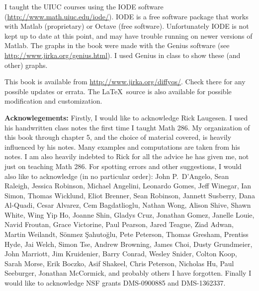 \medskip

I taught the UIUC courses using the IODE software
(\url{http://www.math.uiuc.edu/iode/}).  IODE is a free software package that
works with Matlab (proprietary) or Octave (free software).
Unfortunately IODE is not kept up to date at this point, and may have
trouble running on newer versions of Matlab.
The graphs in the book were made with
the Genius software
(see \url{http://www.jirka.org/genius.html}).  I used Genius
in class to show these (and other) graphs.

This book
is available from
\url{http://www.jirka.org/diffyqs/}.  Check there for any possible
updates or errata.  The \LaTeX\ source is also available
for possible modification and customization.

\medskip

\textbf{Acknowlegements:}
Firstly, I would like to acknowledge Rick Laugesen.  I used his handwritten
class notes
the first time I taught
Math 286.  My organization of this book through chapter 5,
and the choice of
material covered, is heavily influenced by his notes.  Many
examples and computations are taken from his notes.  I am also heavily
indebted to Rick for all the advice he has given me, not just on teaching
Math 286.
For spotting errors and other suggestions,
I would also like to acknowledge (in no particular order):
John P.\ D'Angelo,
Sean Raleigh, Jessica Robinson, Michael Angelini, Leonardo Gomes, Jeff
Winegar, Ian Simon, Thomas Wicklund, Eliot Brenner, Sean Robinson,
Jannett Susberry, Dana Al-Quadi, Cesar Alvarez, Cem Bagdatlioglu,
Nathan Wong, Alison Shive, Shawn White, Wing Yip Ho, Joanne Shin,
Gladys Cruz, Jonathan Gomez, Janelle Louie, Navid Froutan,
Grace Victorine, Paul Pearson, Jared Teague, Ziad Adwan,
Martin Weilandt, S\"{o}nmez \c{S}ahuto\u{g}lu,
Pete Peterson, Thomas Gresham, Prentiss Hyde, Jai Welch,
Simon Tse, Andrew Browning, James Choi, Dusty Grundmeier,
John Marriott,
Jim Kruidenier,
Barry Conrad,
Wesley Snider,
Colton Koop,
Sarah Morse,
Erik Boczko,
Asif Shakeel,
Chris Peterson,
Nicholas Hu,
Paul Seeburger,
Jonathan McCormick,
and probably others I
have forgotten.
Finally I would like
to acknowledge NSF grants DMS-0900885 and DMS-1362337.



